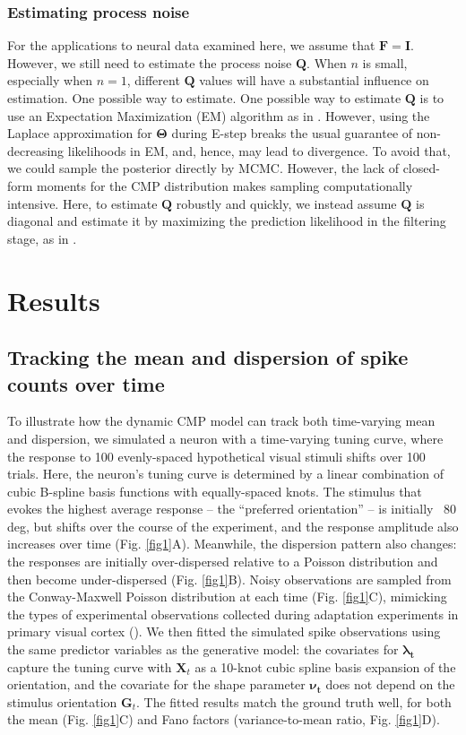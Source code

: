 \documentclass[]{article}
\begin{document}
	\subsubsection{Estimating process noise}
	\label{estQ}
	For the applications to neural data examined here, we assume that $\bm{F}=\bm{I}$. However, we still need to estimate the process noise $\bm{Q}$. When $n$ is small, especially when $n=1$, different $\bm{Q}$ values will have a substantial influence on estimation. One possible way to estimate. One possible way to estimate $\bm{Q}$ is to use an Expectation Maximization (EM) algorithm as in \cite{Macke2011}. However, using the Laplace approximation for $\bm{\Theta}$ during E-step breaks the usual guarantee of non-decreasing likelihoods in EM, and, hence, may lead to divergence. To avoid that, we could sample the posterior directly by MCMC. However, the lack of closed-form moments for the CMP distribution makes sampling computationally intensive. Here, to estimate $\bm{Q}$ robustly and quickly, we instead assume $\bm{Q}$ is diagonal and estimate it by maximizing the prediction likelihood in the filtering stage, as in \cite{Wei2021}. 
	
	\section{Results}
	
	\subsection{Tracking the mean and dispersion of spike counts over time}
	To illustrate how the dynamic CMP model can track both time-varying mean and dispersion, we simulated a neuron with a time-varying tuning curve, where the response to 100 evenly-spaced hypothetical visual stimuli shifts over 100 trials. Here, the neuron’s tuning curve is determined by a linear combination of cubic B-spline basis functions with equally-spaced knots. The stimulus that evokes the highest average response – the “preferred orientation” – is initially ~80 deg, but shifts over the course of the experiment, and the response amplitude also increases over time (Fig. \ref{fig1}A). Meanwhile, the dispersion pattern also changes: the responses are initially over-dispersed relative to a Poisson distribution and then become under-dispersed (Fig. \ref{fig1}B). Noisy observations are sampled from the Conway-Maxwell Poisson distribution at each time (Fig. \ref{fig1}C), mimicking the types of experimental observations collected during adaptation experiments in primary visual cortex (\cite{Dragoi2000}). We then fitted the simulated spike observations using the same predictor variables as the generative model: the covariates for $\bm{\lambda_t}$ capture the tuning curve with $\bm{X}_t$ as a 10-knot cubic spline basis expansion of the orientation, and the covariate for the shape parameter $\bm{\nu_t}$ does not depend on the stimulus orientation $\bm{G}_t$. The fitted results match the ground truth well, for both the mean (Fig. \ref{fig1}C) and Fano factors (variance-to-mean ratio, Fig. \ref{fig1}D).
	
\end{document}
